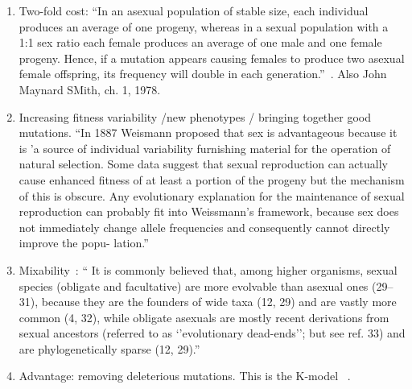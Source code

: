 \begin{enumerate}
\begin{enumerate}
    \item Two-fold cost: ``In an asexual population of stable size, each individual produces an average of one progeny, whereas in a  sexual population with a 1:1 sex ratio each female produces an average of one male and one female progeny. Hence, if a mutation appears causing females to produce two asexual female offspring, its frequency will double in each generation.''~\cite{kondrashov_deleterious_1988}. Also John Maynard SMith, ch. 1, 1978.

    \item Increasing fitness variability /new phenotypes / bringing together good mutations. ``In 1887 Weismann proposed that sex is advantageous because it is 'a source of individual variability furnishing material for  the operation of natural selection. Some data suggest that sexual reproduction can actually cause enhanced fitness of at least a portion of the progeny but the mechanism of this is obscure. Any evolutionary explanation for the maintenance of sexual reproduction can probably fit into Weissmann's framework, because sex does not immediately change allele frequencies and consequently cannot directly improve the popu- lation.''~\cite{kondrashov_deleterious_1988}
    
    \item Mixability~\cite{livnat_mixability_2008}: `` It is commonly believed that, among higher organisms, sexual species (obligate and facultative) are more evolvable than asexual ones (29–31), because they are the founders of wide taxa (12, 29) and are vastly more common (4, 32), while obligate asexuals are mostly recent derivations from sexual ancestors (referred to as ‘’evolutionary dead-ends’’; but see ref. 33) and are phylogenetically sparse (12, 29).”
    
    \item Advantage: removing deleterious mutations. This is the K-model ~\cite{kondrashov_deleterious_1988}.


\end{enumerate}



\end{enumerate}
